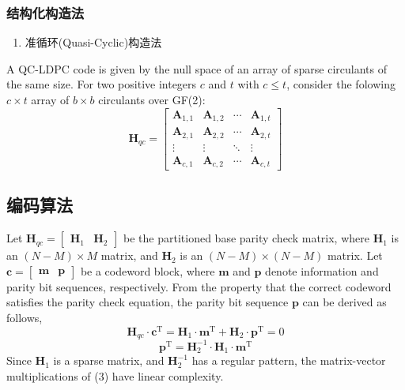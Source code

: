 \documentclass{article}
\begin{document}
\subsubsection{结构化构造法}
\begin{enumerate}[--]
	\item 准循环(Quasi-Cyclic)构造法
\end{enumerate}
A QC-LDPC code is given by the null space of an array of sparse circulants of 
the same size. For two positive integers $c$ and $t$ with $c\leq t$, consider the 
folowing $c\times t$ array of $b\times b$ circulants over GF(2):
\begin{equation}
	\textbf{H}_{qc}=\begin{bmatrix}
		\textbf{A}_{1,1}&\textbf{A}_{1,2}&\cdots&\textbf{A}_{1,t}\\
		\textbf{A}_{2,1}&\textbf{A}_{2,2}&\cdots&\textbf{A}_{2,t}\\
		\vdots&\vdots&\ddots&\vdots\\
		\textbf{A}_{c,1}&\textbf{A}_{c,2}&\cdots&\textbf{A}_{c,t}
	\end{bmatrix}
\end{equation}
\subsection{编码算法}
Let $\textbf{H}_{qc}=\begin{bmatrix}\textbf{H}_{1}&\textbf{H}_{2}\end{bmatrix}$ be 
the partitioned base parity check matrix, where $\textbf{H}_{1}$ is an $(N-M)\times
M$ matrix, and $\textbf{H}_{2}$ is an $(N-M)\times (N-M)$ matrix. Let $\textbf{c}=
\begin{bmatrix}\textbf{m}&\textbf{p}\end{bmatrix}$ be a codeword block, where 
$\textbf{m}$ and $\textbf{p}$ denote information and parity bit sequences, respectively. 
From the property that the correct codeword satisfies the parity check equation, the 
parity bit sequence $\textbf{p}$ can be derived as follows,
\begin{equation}
	\textbf{H}_{qc}\cdot \textbf{c}^ \mathrm{T}=\textbf{H}_1\cdot \textbf{m}^\mathrm{T}+
	\textbf{H}_2\cdot \textbf{p}^\mathrm{T}=0
\end{equation}
\begin{equation}
	\textbf{p}^\mathrm{T}=\textbf{H}_2^{-1}\cdot\textbf{H}_1\cdot \textbf{m}^\mathrm{T}
\end{equation}
Since $\textbf{H}_1$ is a sparse matrix, and $\textbf{H}_2^{-1}$ has a regular pattern, 
the matrix-vector multiplications of (3) have linear complexity.
\end{document}
